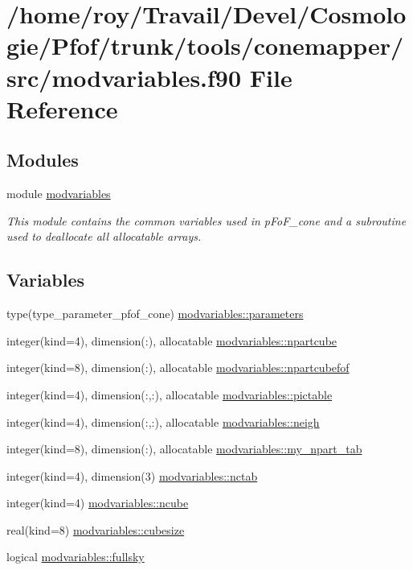 \hypertarget{tools_2conemapper_2src_2modvariables_8f90}{}\section{/home/roy/\+Travail/\+Devel/\+Cosmologie/\+Pfof/trunk/tools/conemapper/src/modvariables.f90 File Reference}
\label{tools_2conemapper_2src_2modvariables_8f90}
\subsection*{Modules}
\begin{DoxyCompactItemize}
\item 
module \hyperlink{namespacemodvariables}{modvariables}
\begin{DoxyCompactList}\small\item\em This module contains the common variables used in p\+Fo\+F\+\_\+cone and a subroutine used to deallocate all allocatable arrays. \end{DoxyCompactList}\end{DoxyCompactItemize}
\subsection*{Variables}
\begin{DoxyCompactItemize}
\item 
type(type\+\_\+parameter\+\_\+pfof\+\_\+cone) \hyperlink{namespacemodvariables_a3a05eb7a0d11075c67b3f7c927170b48}{modvariables\+::parameters}
\item 
integer(kind=4), dimension(\+:), allocatable \hyperlink{namespacemodvariables_a8cd49c574b692bbeae7029e8d138f58e}{modvariables\+::npartcube}
\item 
integer(kind=8), dimension(\+:), allocatable \hyperlink{namespacemodvariables_a5e0afff3c4cb1ac79dd8ec2f3a7752d9}{modvariables\+::npartcubefof}
\item 
integer(kind=4), dimension(\+:,\+:), allocatable \hyperlink{namespacemodvariables_aa09a585a04de1f8fba311a2f440db992}{modvariables\+::pictable}
\item 
integer(kind=4), dimension(\+:,\+:), allocatable \hyperlink{namespacemodvariables_a8602ecbf617fcd3d1c712a4ace68843c}{modvariables\+::neigh}
\item 
integer(kind=8), dimension(\+:), allocatable \hyperlink{namespacemodvariables_a64ba80f97884e73fedc7341570a93bd9}{modvariables\+::my\+\_\+npart\+\_\+tab}
\item 
integer(kind=4), dimension(3) \hyperlink{namespacemodvariables_a0a00ccc148897945f3defb5f775e4c18}{modvariables\+::nctab}
\item 
integer(kind=4) \hyperlink{namespacemodvariables_ab094334ab9c4ab8644017abf18dcd25f}{modvariables\+::ncube}
\item 
real(kind=8) \hyperlink{namespacemodvariables_a12af092709e4d0b68394a217d16c4489}{modvariables\+::cubesize}
\item 
logical \hyperlink{namespacemodvariables_ace518a722b9c63f8c88c4915aa9a7549}{modvariables\+::fullsky}
\end{DoxyCompactItemize}
